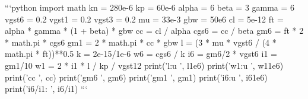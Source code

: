 ```python import math\markdownRendererInterblockSeparator
{}kn = 280e-6 kp = 60e-6\markdownRendererInterblockSeparator
{}alpha = 6 beta = 3 gamma = 6 vgst6 = 0.2 vgst1 = 0.2 vgst3 = 0.2\markdownRendererInterblockSeparator
{}mu = 33e-3\markdownRendererInterblockSeparator
{}gbw = 50e6 cl = 5e-12\markdownRendererInterblockSeparator
{}ft = alpha * gamma * (1 + beta) * gbw\markdownRendererInterblockSeparator
{}cc = cl / alpha cgs6 = cc / beta gm6 = ft * 2 * math.pi * cgs6 gm1 = 2 * math.pi * cc * gbw\markdownRendererInterblockSeparator
{}l = (3 * mu * vgst6 / (4 * math.pi * ft))**0.5\markdownRendererInterblockSeparator
{}k = 2e-15/1e-6 w6 = cgs6 / k i6 = gm6/2 * vgst6\markdownRendererInterblockSeparator
{}i1 = gm1/10\markdownRendererInterblockSeparator
{}w1 = 2 * i1 * l / kp / vgst12\markdownRendererInterblockSeparator
{}print('l:u ', l1e6) print('w1:u ', w11e6) print('cc ', cc) print('gm6 ', gm6) print('gm1 ', gm1) print('i6:u ', i61e6) print('i6/i1: ', i6/i1) ```\relax